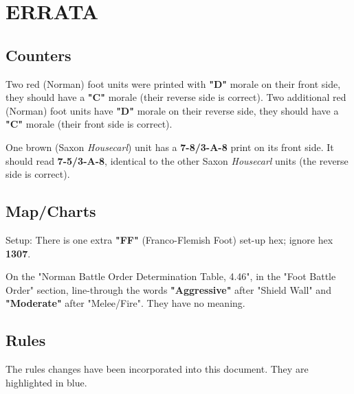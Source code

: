 \section{ERRATA}

\subsection{Counters}

Two red (Norman) foot units were printed with \textbf{"D"} morale on their front side, they should have a \textbf{"C"} morale (their reverse side is correct). Two additional red (Norman) foot units have \textbf{"D"} morale on their reverse side, they should have a \textbf{"C"} morale (their front side is correct).

One brown (Saxon \textit{Housecarl}) unit has a \textbf{7-8/3-A-8} print on its front side. It should read \textbf{7-5/3-A-8}, identical to the other Saxon \textit{Housecarl} units (the reverse side is correct).

\subsection{Map/Charts}

Setup: There is one extra \textbf{"FF"} (Franco-Flemish Foot) set-up hex; ignore hex \textbf{1307}.

On the "Norman Battle Order Determination Table, 4.46", in the "Foot Battle Order" section, line-through the words \textbf{"Aggressive"} after "Shield Wall" and \textbf{"Moderate"} after "Melee/Fire". They have no meaning.

\subsection{Rules}

The rules changes have been incorporated into this document. They are highlighted in blue.